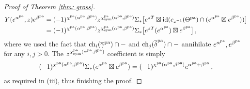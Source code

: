 \documentclass[a4paper, 12pt]{amsart}
\begin{document}
\begin{proof}[Proof of Theorem \ref{thm: gross}]
\begin{align*} Y(e^{\alpha^{\pa}},z)e^{\beta^{\pa}}
&= (-1)^{\chi^{\pa}(\alpha^{\pa},\beta^{\pa})}z^{\chi_\sym^{\pa}(\alpha^{\pa},\beta^{\pa})}\Sigma_*\big[e^{zT}\boxtimes \id (c_{z^{-1}}(\Theta^{\pa})\cap (e^{\alpha^{\pa}}\boxtimes e^{\beta^{\pa}}))\big]\\
&=(-1)^{\chi^{\pa}(\alpha^{\pa},\beta^{\pa})}z^{\chi_\sym^{\pa}(\alpha^{\pa},\beta^{\pa})}\Sigma_*\big[e^{zT}(e^{\alpha^{\pa}})\boxtimes  e^{\beta^{\pa}}\big]\,,
\end{align*}
where we used the fact that $\ch_i(\overline \gamma^{\pa})\cap -$ and $\ch_j(\overline \delta^{\pa})\cap -$ annihilate $e^{\alpha^{\pa}}, e^{\beta^{\pa}}$ for any $i,j>0$. The $z^{\chi_\sym^{\pa}(\alpha^{\pa},\beta^{\pa})}$ coefficient is simply
\[(-1)^{\chi^{\pa}(\alpha^{\pa},\beta^{\pa})}\Sigma_*(e^{\alpha^{\pa}}\boxtimes e^{\beta^{\pa}})=(-1)^{\chi^{\pa}(\alpha^{\pa},\beta^{\pa})}e^{\alpha^{\pa}+\beta^{\pa}}\,,\]
as required in (iii), thus finishing the proof.\qedhere
\end{proof}
\end{document}
